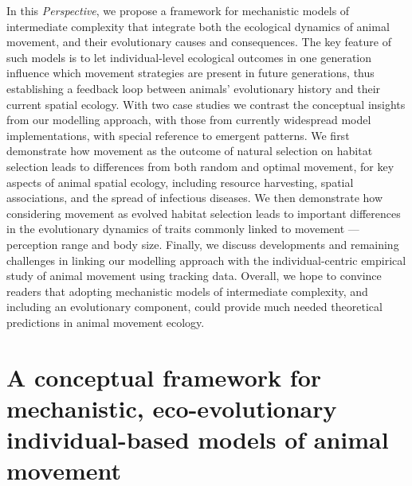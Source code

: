 In this \textit{Perspective}, we propose a framework for mechanistic models of intermediate complexity that integrate both the ecological dynamics of animal movement, and their evolutionary causes and consequences.
The key feature of such models is to let individual-level ecological outcomes in one generation influence which movement strategies are present in future generations, thus establishing a feedback loop between animals' evolutionary history and their current spatial ecology.
With two case studies we contrast the conceptual insights from our modelling approach, with those from currently widespread model implementations, with special reference to emergent patterns.
We first demonstrate how movement as the outcome of natural selection on habitat selection leads to differences from both random and optimal movement, for key aspects of animal spatial ecology, including resource harvesting, spatial associations, and the spread of infectious diseases.
We then demonstrate how considering movement as evolved habitat selection leads to important differences in the evolutionary dynamics of traits commonly linked to movement ---  perception range and body size.
Finally, we discuss developments and remaining challenges in linking our modelling approach with the individual-centric empirical study of animal movement using tracking data.
Overall, we hope to convince readers that adopting mechanistic models of intermediate complexity, and including an evolutionary component, could provide much needed theoretical predictions in animal movement ecology.

\section{A conceptual framework for mechanistic, eco-evolutionary individual-based models of animal movement}




